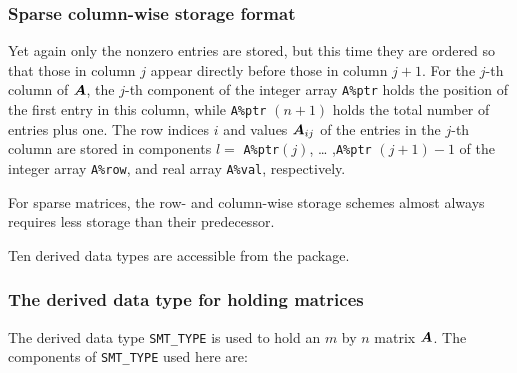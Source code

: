 \documentclass{galahad}
\begin{document}
\subsubsection{Sparse column-wise storage format}\label{columnwise}
Yet again only the nonzero entries are stored, but this time they are
ordered so that those in column $j$ appear directly before those in column
$j+1$. For the $j$-th column of ${\bm{A}}$, the $j$-th component of the integer
array {\tt A\%ptr} holds the position of the first entry in this column,
while {\tt A\%ptr} $(n+1)$ holds the total number of entries plus one.
The row indices $i$ and values ${\bm{A}}_{ij}$ of the entries in the
$j$-th column are stored in components $l =$ {\tt A\%ptr}$(j)$, \ldots
,{\tt A\%ptr} $(j+1)-1$ of the integer array {\tt A\%row}, and real
array {\tt A\%val}, respectively.

For sparse matrices, the row- and column-wise storage schemes almost always
requires less storage than their predecessor.





\galtypes
Ten derived data types are accessible from the package.


\subsubsection{The derived data type for holding matrices}\label{typesmt}
The derived data type {\tt SMT\_TYPE} is used to hold an $m$ by $n$ 
matrix ${\bm{A}}$. The components of {\tt SMT\_TYPE} used here are:
\end{document}

